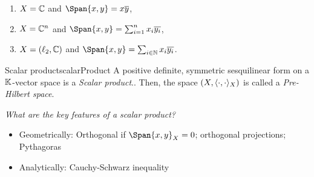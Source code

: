 \documentclass[language=english]{../../Template/TemplateLecture}
\begin{document}
\begin{beispiel}
    \begin{enumerate}[$(i)$]
        \item $X = \mathbb{C}$ and $\Span{x,y} = x\overline{y}$,
        \item $X = \mathbb{C}^n$ and $\Span{x,y} = \sum_{i = 1}^n x_i \overline{y_i}$,
        \item $X = (\ell_2,\mathbb{C})$ and $\Span{x,y} = \sum_{i \in \IN} x_i \overline{y_i}$.
    \end{enumerate}
\end{beispiel}

\begin{defi}{Scalar product}{scalarProduct}
    A positive definite, symmetric sesquilinear form on a $\mathbb{K}$-vector space is a \emph{Scalar product}.. Then, the space $(X, \langle\cdot,\cdot\rangle_X)$ is called a \emph{Pre-Hilbert space}.
\end{defi}
\emph{What are the key features of a scalar product?}
\begin{itemize}
    \item Geometrically: Orthogonal if $\Span{x,y}_X = 0$; orthogonal projections; Pythagoras
    \item Analytically: Cauchy-Schwarz inequality
\end{itemize}
\end{document}
